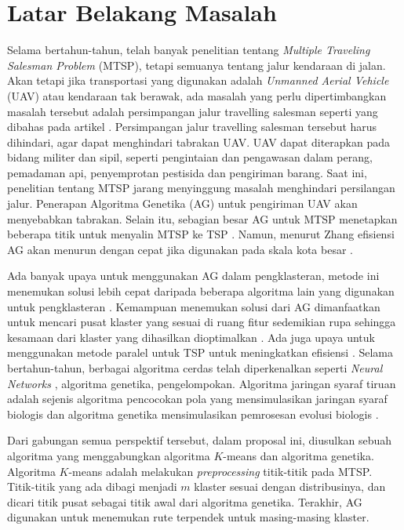 
\section{Latar Belakang Masalah}

Selama bertahun-tahun, telah banyak penelitian tentang \textit{Multiple Traveling Salesman Problem} (MTSP), tetapi semuanya tentang jalur kendaraan di jalan. Akan tetapi jika transportasi yang digunakan adalah \textit{Unmanned Aerial Vehicle} (UAV) atau kendaraan tak berawak, ada masalah yang perlu dipertimbangkan masalah tersebut adalah persimpangan jalur travelling salesman seperti yang dibahas pada artikel \cite{inproceedings}. Persimpangan jalur travelling salesman tersebut harus dihindari, agar dapat menghindari tabrakan UAV. UAV dapat diterapkan pada bidang militer dan sipil, seperti pengintaian dan pengawasan dalam perang, pemadaman api, penyemprotan pestisida dan pengiriman barang.
Saat ini, penelitian tentang MTSP jarang menyinggung masalah menghindari persilangan jalur. Penerapan Algoritma Genetika (AG) untuk pengiriman UAV akan menyebabkan tabrakan. Selain itu, sebagian besar AG untuk MTSP menetapkan beberapa titik untuk menyalin MTSP ke TSP \cite{shengping2002hybrid}. Namun, menurut Zhang efisiensi AG akan menurun dengan cepat jika digunakan pada skala kota besar \cite{zhang2014parallel}.

Ada banyak upaya untuk menggunakan AG dalam pengklasteran, metode ini menemukan solusi lebih cepat daripada beberapa algoritma lain yang digunakan untuk pengklasteran \cite{krishna1999genetic}. Kemampuan menemukan solusi dari AG dimanfaatkan untuk mencari pusat klaster yang sesuai di ruang fitur sedemikian rupa sehingga kesamaan dari klaster yang dihasilkan dioptimalkan \cite{maii2000genetic}. Ada juga upaya untuk menggunakan metode paralel untuk TSP untuk meningkatkan efisiensi \cite{li2016parallel}. Selama bertahun-tahun, berbagai algoritma cerdas telah diperkenalkan seperti  \textit{Neural Networks} \cite{song2015asynchronous,zhang2015universality,pan2012spiking}, algoritma genetika, pengelompokan. Algoritma jaringan syaraf tiruan adalah sejenis algoritma pencocokan pola yang mensimulasikan jaringan syaraf biologis dan algoritma genetika mensimulasikan pemrosesan evolusi biologis \cite{liu2015implementation,zeng2014spiking,xu2016probe,zhang2014efficient}.

Dari gabungan semua perspektif tersebut, dalam proposal ini, diusulkan sebuah algoritma yang menggabungkan algoritma $K$-means dan algoritma genetika. Algoritma $K$-means adalah melakukan \textit{preprocessing} titik-titik pada MTSP. Titik-titik yang ada dibagi menjadi $m$ klaster sesuai dengan distribusinya, dan dicari titik pusat sebagai titik awal dari algoritma genetika. Terakhir, AG digunakan untuk menemukan rute terpendek untuk masing-masing klaster.%